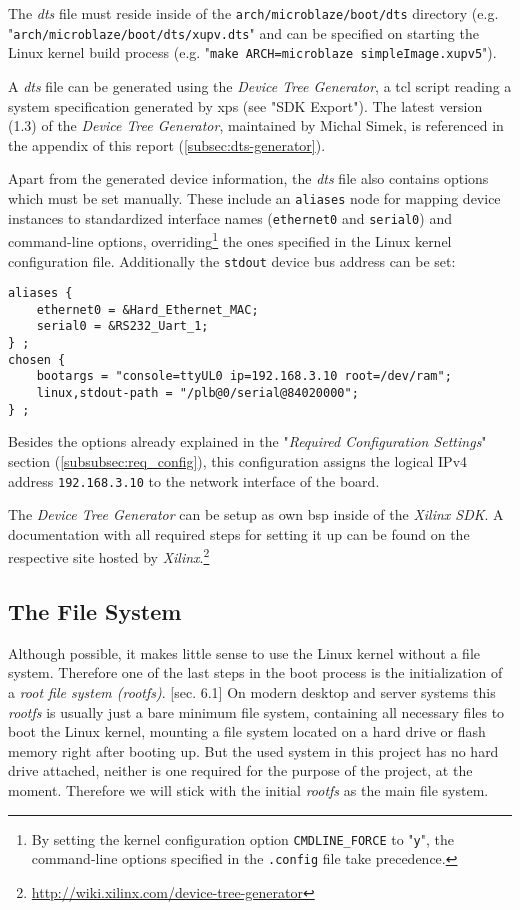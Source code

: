 The \textit{dts} file must reside inside of the \texttt{arch/microblaze/boot/dts} directory (e.g. "\texttt{arch/microblaze/boot/dts/xupv.dts}" and can be specified on starting the Linux kernel build process (e.g. "\texttt{make ARCH=microblaze simpleImage.xupv5}").

A \textit{dts} file can be generated using the \textit{Device Tree Generator}, a \gls{tcl} script reading a system specification generated by \gls{xps} (see "SDK Export"). The latest version (1.3) of the \textit{Device Tree Generator}, maintained by Michal Simek, is referenced in the appendix of this report (\ref{subsec:dts-generator}).

Apart from the generated device information, the \textit{dts} file also contains options which must be set manually. These include an \texttt{aliases} node for mapping device instances to standardized interface names (\texttt{ethernet0} and \texttt{serial0}) and command-line options, overriding\footnote{By setting the kernel configuration option \texttt{CMDLINE\_FORCE} to "\texttt{y}", the command-line options specified in the \texttt{.config} file take precedence.} the ones specified in the Linux kernel configuration file. Additionally the \texttt{stdout} device bus address can be set:

\begin{verbatim}
aliases {
    ethernet0 = &Hard_Ethernet_MAC;
    serial0 = &RS232_Uart_1;
} ;
chosen {
    bootargs = "console=ttyUL0 ip=192.168.3.10 root=/dev/ram";
    linux,stdout-path = "/plb@0/serial@84020000";
} ;
\end{verbatim}

Besides the options already explained in the "\textit{Required Configuration Settings}" section (\ref{subsubsec:req_config}), this configuration assigns the logical IPv4 address \texttt{192.168.3.10} to the network interface of the board.

The \textit{Device Tree Generator} can be setup as own \gls{bsp} inside of the \textit{Xilinx SDK}. A documentation with all required steps for setting it up can be found on the respective site hosted by \textit{Xilinx}.\footnote{\url{http://wiki.xilinx.com/device-tree-generator}}


\subsection{The File System}
\label{subsec:fs}

Although possible, it makes little sense to use the Linux kernel without a file system. Therefore one of the last steps in the boot process is the initialization of a \textit{root file system (rootfs)}. \cite{linuxPrimer}[sec. 6.1] On modern desktop and server systems this \textit{rootfs} is usually just a bare minimum file system, containing all necessary files to boot the Linux kernel, mounting a file system located on a hard drive or flash memory right after booting up. But the used system in this project has no hard drive attached, neither is one required for the purpose of the project, at the moment. Therefore we will stick with the initial \textit{rootfs} as the main file system.

